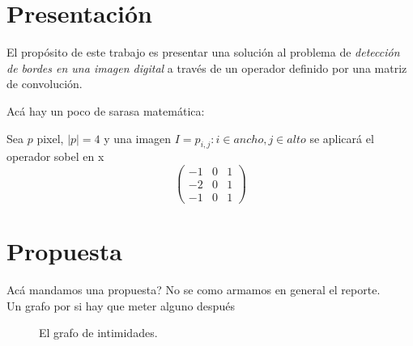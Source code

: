 \documentclass[11pt]{article}
\begin{document}






\maketitle

\tableofcontents

\newpage
\section{Presentación}
El propósito de este trabajo es presentar una solución al problema de
\emph{detección de bordes en una imagen digital} a través de un operador definido por una matriz de convolución.


Acá hay un poco de sarasa matemática:\\
\begin{center}
\begin{minipage}{5in}
Sea $p$ pixel, $|p|=4$ y una imagen $I = {p_{i,j} : i \in ancho, j \in alto}$ se aplicará el operador sobel en x
\[ \left( \begin{array}{ccc}
-1 & 0 & 1 \\
-2 & 0 & 1 \\
-1 & 0 & 1 \end{array} \right)\]

\end{minipage}
\end{center}



\newpage
\section{Propuesta}
Acá mandamos una propuesta? No se como armamos en general el reporte.\\
Un grafo por si hay que meter alguno después

\begin{figure}[H]
	\centerline{
	}
	\caption{El grafo de intimidades.}
	\label{fig:grafoIntimidades}
\end{figure}
\end{document}

